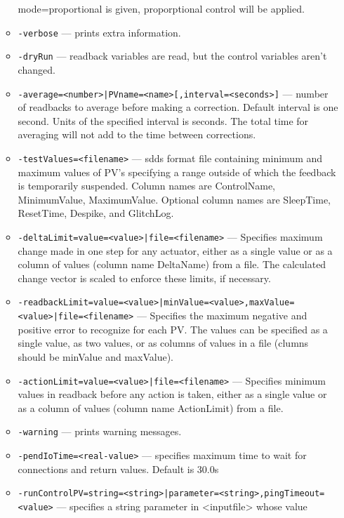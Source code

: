 \begin{itemize}
\begin{itemize}
               mode=proportional is given, proporptional control will be applied. 
        \item {\tt -verbose} --- prints extra information.
        \item {\tt -dryRun} --- readback variables are read, but the control variables
               aren't changed.
        \item {\tt -average=<number>|PVname=<name>[,interval=<seconds>]} ---  number of readbacks to average before making a correction.
               Default interval is one second. Units of the specified 
               interval is seconds. The total time for averaging will
               not add to the time between corrections.
        \item {\tt -testValues=<filename>} --- sdds format file containing minimum and maximum values
               of PV's specifying a range outside of which the feedback
               is temporarily suspended. Column names are ControlName,
               MinimumValue, MaximumValue. Optional column names are 
               SleepTime, ResetTime, Despike, and GlitchLog.
        \item {\tt -deltaLimit=value=<value>|file=<filename>} --- Specifies maximum change made in one step for any actuator,
               either as a single value or as a column of values (column name
               DeltaName) from a file. The calculated change vector is scaled
               to enforce these limits, if necessary.
        \item {\tt -readbackLimit=value=<value>|minValue=<value>,maxValue=<value>|file=<filename>} --- Specifies the maximum negative and positive error to
               recognize for each PV. The values can be specified
               as a single value, as two values, or as columns of
               values in a file (clumns should be minValue and maxValue).
        \item {\tt -actionLimit=value=<value>|file=<filename>} --- Specifies minimum values in readback before any action is
               taken, either as a single value or as a column of values
               (column name ActionLimit) from a file.
        \item {\tt -warning} --- prints warning messages.
        \item {\tt -pendIoTime=<real-value>} --- specifies maximum time to wait for connections and
               return values.  Default is 30.0s 
        \item {\tt -runControlPV=string=<string>|parameter=<string>,pingTimeout=<value>} --- specifies a string parameter in <inputfile> whose value

\end{itemize}
\end{itemize}

